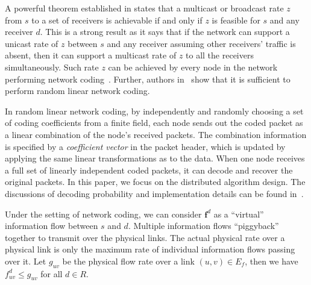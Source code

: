 \documentclass[10pt,conference]{IEEEtran}
\begin{document}
A powerful theorem established in \cite{all:NetCod:ACLY00} states
that a multicast or broadcast rate $z$ from
$s$ to a set of receivers is achievable if and only if $z$ is feasible
for $s$ and any receiver $d$. This is
a strong result as it says that if the network can support a unicast
rate of $z$ between $s$ and any receiver assuming other receivers'
traffic is absent, then it can support a multicast rate of $z$ to
all the receivers simultaneously. Such rate $z$ can be achieved by every
node in the network performing network coding~\cite{all:NetCod:ACLY00}. Further, authors in~\cite{ho2009dynamic,chou2003practical}
show that it is sufficient to perform random linear network coding.

In random linear network coding, by independently and randomly choosing
a set of coding coefficients from a finite field, each node sends
out the coded packet as a linear combination of the
node's received packets. The combination information is
specified by a \emph{coefficient vector} in the packet header, which is
updated by applying the same linear transformations as to the data. When
one node receives a full set of linearly independent coded packets,
it can decode and recover the original packets. In this paper, we
focus on the distributed algorithm design. The discussions of
decoding probability and implementation details
can be found in~\cite{ho2009dynamic,chou2003practical}.

Under the setting of network coding, we can consider $\boldsymbol{f}^{d}$ as a {}``virtual''
information flow between $s$ and $d$. Multiple information flows
{}``piggyback'' together to transmit over the physical links. The
actual physical rate over a physical link is only the maximum rate
of individual information flows passing over it. Let $g_{uv}$ be the physical
flow rate over a link $(u,v)\in E_{f}$, then we have $f_{uv}^{d}\leq g_{uv}$
for all $d\in R$.
\end{document}
